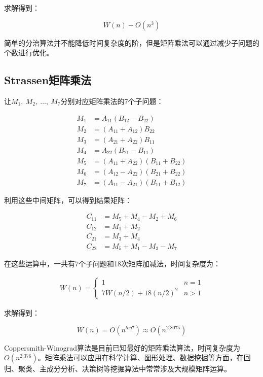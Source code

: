 求解得到：

\vspace{-0.5cm}

$$
	W(n) - O(n^3)
$$

简单的分治算法并不能降低时间复杂度的阶，但是矩阵乘法可以通过减少子问题的个数进行优化。\\

\subsection{Strassen矩阵乘法}

让$  M_1,\ M_2,\ \dots,\ M_7 $分别对应矩阵乘法的7个子问题：

\vspace{-0.5cm}

\begin{align*}
	M_1 & = A_{11}(B_{12} - B_{22})            \\
	M_2 & = (A_{11} + A_{12})B_{22}            \\
	M_3 & = (A_{21} + A_{22})B_{11}            \\
	M_4 & = A_{22}(B_{21} - B_{11})            \\
	M_5 & = (A_{11} + A_{22})(B_{11} + B_{22}) \\
	M_6 & = (A_{12} - A_{22})(B_{21} + B_{22}) \\
	M_7 & = (A_{11} - A_{21})(B_{11} + B_{12})
\end{align*}

利用这些中间矩阵，可以得到结果矩阵：

\vspace{-1cm}

\begin{align*}
	C_{11} & = M_5 + M_4 - M_2 + M_6 \\
	C_{12} & = M_1 + M_2             \\
	C_{21} & = M_3 + M_4             \\
	C_{22} & = M_5 + M_1 - M_3 - M_7
\end{align*}

在这些运算中，一共有7个子问题和18次矩阵加减法，时间复杂度为：

\vspace{-1cm}

\begin{align*}
	W(n) = \begin{cases}
		1                   & n = 1 \\
		7W(n/2) + 18(n/2)^2 & n > 1
	\end{cases}
\end{align*}

求解得到：

\vspace{-0.5cm}

$$
	W(n) = O(n^{log7}) \approx O(n^{2.8075})
$$

Coppersmith-Winograd算法是目前已知最好的矩阵乘法算法，时间复杂度为$ O(n^{2.376}) $。矩阵乘法可以应用在科学计算、图形处理、数据挖掘等方面，在回归、聚类、主成分分析、决策树等挖掘算法中常常涉及大规模矩阵运算。

\newpage